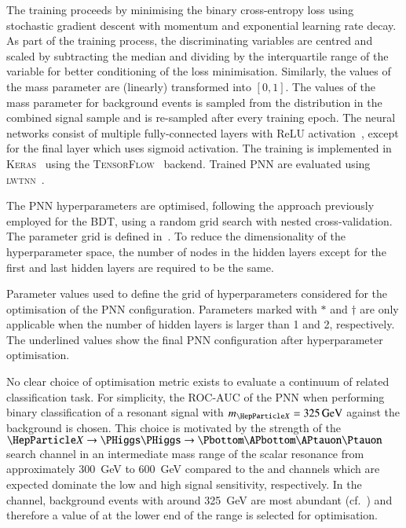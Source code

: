 The training proceeds by minimising the binary cross-entropy loss
using stochastic gradient descent with momentum and exponential
learning rate decay. As part of the training process, the
discriminating variables are centred and scaled by subtracting the
median and dividing by the interquartile range of the variable for
better conditioning of the loss minimisation. Similarly, the values of
the mass parameter are (linearly) transformed into $[0, 1]$. The
values of the mass parameter for background events is sampled from the
\mX distribution in the combined signal sample and is re-sampled after
every training epoch. The neural networks consist of multiple
fully-connected layers with ReLU activation~\cite{nair:relu}, except
for the final layer which uses sigmoid activation. The training is
implemented in \textsc{Keras}~\cite{keras} using the
\textsc{TensorFlow}~\cite{tensorflow2015-whitepaper} backend. Trained
PNN are evaluated using \textsc{lwtnn}~\cite{lwtnn}.

The PNN hyperparameters are optimised, following the approach
previously employed for the BDT, using a random grid search with
nested cross-validation. The parameter grid is defined
in~. To reduce the dimensionality of
the hyperparameter space, the number of nodes in the hidden layers
except for the first and last hidden layers are required to be the
same.

\begin{table}[htbp]
  \centering

  \caption[Hyperparameter values of the PNN extracting the resonant \HH signals
  in the \hadhad channel.]{Parameter values used to define the grid of
    hyperparameters considered for the optimisation of the PNN
    configuration. Parameters marked with $*$ and $\dagger$ are only applicable
    when the number of hidden layers is larger than 1 and 2, respectively. The
    underlined values show the final PNN configuration after hyperparameter
    optimisation.}%
  \label{tab:hyperparameter_grid_pnn}

  
\end{table}

No clear choice of optimisation metric exists to evaluate a continuum
of related classification task. For simplicity, the ROC-AUC of the PNN
when performing binary classification of a resonant signal with
$\mX = \SI{325}{\GeV}$ against the background is chosen. This choice
is motivated by the strength of the $\PX \to \HH \to \bbtautau$ search
channel in an intermediate mass range of the scalar resonance from
approximately \SI{300}{\GeV} to \SI{600}{\GeV} compared to the \bbyy
and \bbbb channels which are expected dominate the low and high \mX
signal sensitivity, respectively. In the \hadhad channel, background
events with \mHH around \SI{325}{\GeV} are most abundant
(cf.~) and therefore a value of \mX at the lower
end of the range is selected for optimisation.

